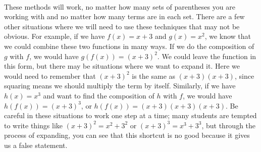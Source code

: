 \\

These methods will work, no matter how many sets of parentheses you are working with and no matter how many terms are in each set. There are a few other situations where we will need to use these techniques that may not be obvious. For example, if we have $f(x)=x+3$ and $g(x)=x^2$, we know that we could combine these two functions in many ways. If we do the composition of $g$ with $f$, we would have $g(f(x))=(x+3)^2$. We could leave the function in this form, but there may be situations where we want to expand it. Here we would need to remember that $(x+3)^2$ is the same as $(x+3)(x+3)$, since squaring means we should multiply the term by itself. Similarly, if we have $h(x)=x^3$ and want to find the composition of $h$ with $f$, we would have $h(f(x))=(x+3)^3$, or $h(f(x))=(x+3)(x+3)(x+3)$. Be careful in these situations to work one step at a time; many students are tempted to write things like $(x+3)^2 = x^2 + 3^2$ or $(x+3)^3 = x^3 + 3^3$, but through the process of expanding, you can see that this shortcut is no good because it gives us a false statement.

